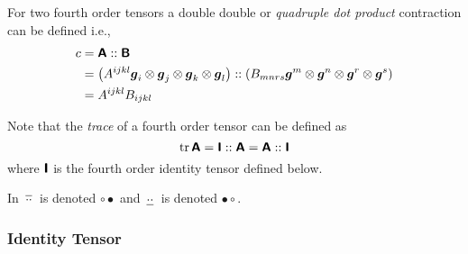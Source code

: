 For two fourth order tensors a double double or \emph{quadruple dot product}
contraction can be defined i.e., 
\begin{equation}
  \begin{aligned}
    c&= \boldsymbol{\mathsf{A}} :: \boldsymbol{\mathsf{B}} \\
    &= \left( A^{ijkl} \boldsymbol{g}_{i} \otimes \boldsymbol{g}_{j} \otimes \boldsymbol{g}_{k} \otimes \boldsymbol{g}_{l}  \right) :: \left( B_{mnrs} \boldsymbol{g}^{m} \otimes \boldsymbol{g}^{n} \otimes \boldsymbol{g}^{r} \otimes \boldsymbol{g}^{s}  \right) \\
    &=A^{ijkl}B_{ijkl}
  \end{aligned}
\end{equation}

Note that the \emph{trace} of a fourth order tensor can be defined as
\begin{equation}
  \trace{}{\tensorfour{A}}=\quaddotprod{\identitytensorfour}{\tensorfour{A}}=\quaddotprod{\tensorfour{A}}{\identitytensorfour}
\end{equation}
where $  \boldsymbol{\mathsf{ I }}  $ is the fourth order identity tensor defined below.

In \cite{kintzel_fourth-order_2006,kintzel_fourth-order2_2006}
$ \, \overline{\cdot\cdot} \, $ is denoted $\circ\bullet$ and $ \, \underline{\cdot\cdot} \, $ is denoted $\bullet\circ$.

\subsubsection{Identity Tensor}
\label{subsubsec:IdentityTensorFourthOrder}

